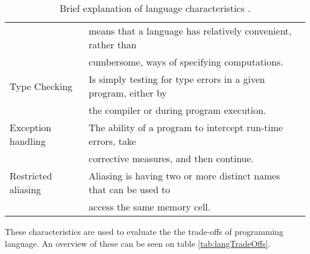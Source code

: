 \begin{table}[H]
\begin{tabular}{|l|l|}
		~						& means that a language has relatively convenient, rather than		\\
		~						& cumbersome, ways of specifying computations.						\\ \hline
		Type Checking			& Is simply testing for type errors in a given program, either by	\\
		~						& the compiler or during program execution.							\\ \hline
		Exception handling		& The ability of a program to intercept run-time errors, take		\\
		~						& corrective measures, and then continue.							\\ \hline
		Restricted aliasing		& Aliasing is having two or more distinct names that can be used to	\\
		~						& access the same memory cell.										\\ \hline
		
	\end{tabular}
	\caption{Brief explanation of language characteristics \citep{sebesta}.}
	\label{tab:langCharacteristics}
\end{table}
These characteristics are used to evaluate the the trade-offs of programming language. An overview of these can be seen on table \ref{tab:langTradeOffs}.

